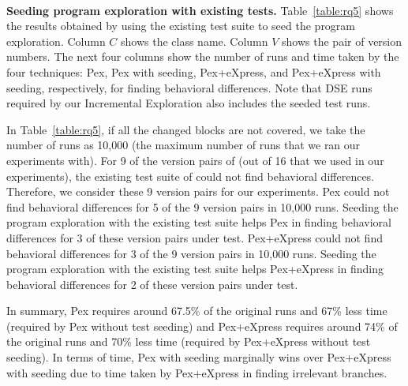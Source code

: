 \\ \textbf{Seeding program exploration with existing tests.} Table~\ref{table:rq5} shows the results obtained by using the existing test suite to seed the program exploration. Column $C$ shows the class name. Column $V$ shows the pair of version numbers. The next four columns show the number of runs and time taken by the four techniques: Pex, Pex with seeding, Pex+eXpress, and Pex+eXpress with seeding, respectively, for  finding behavioral differences. 
Note that DSE runs required by our Incremental Exploration also includes the seeded test runs.
 
In Table~\ref{table:rq5}, if all the changed blocks are not covered, we take the 
number of runs as 10,000 (the maximum number of runs that we ran our experiments with).
For 9 of the version pairs of  (out of 16 that we used in our experiments), the existing test suite of  could not find behavioral differences. Therefore, we consider these 9 version pairs for our experiments. 
Pex could not find behavioral differences for 5 of the 9 version pairs in 10,000 runs. Seeding the program exploration with the existing test suite helps Pex in finding behavioral differences for 3 of these version pairs under test.
Pex+eXpress could not find behavioral differences for 3 of the 9 version pairs in 10,000 runs. Seeding the program exploration with the existing test suite helps Pex+eXpress in finding behavioral differences for 2 of these version pairs under test.

In summary, Pex requires around 67.5\% of the original runs and 67\% less time (required by Pex without test seeding) 
and Pex+eXpress requires around 74\% of the original runs and 70\% less time (required by Pex+eXpress without test seeding).
In terms of time, Pex with seeding marginally wins over Pex+eXpress 
with seeding due to time taken by Pex+eXpress in finding irrelevant branches.


